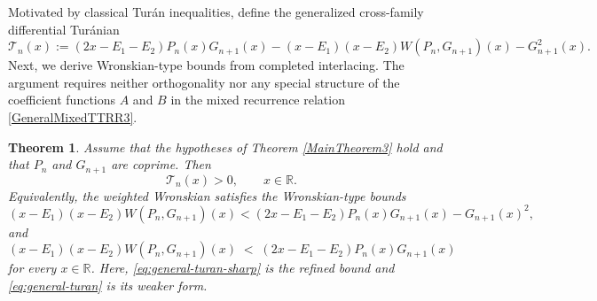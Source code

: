 \documentclass[final,3p,times,12pt]{elsarticle}
\newtheorem{theorem}{Theorem}[section]
\numberwithin{equation}{section}  %
\begin{document}
Motivated by classical Tur\'{a}n inequalities, define the
generalized cross-family differential Tur\'{a}nian
\[
\mathcal{T}_n(x):=
(2x-E_1-E_2)P_n(x)G_{n+1}(x)
-(x-E_1)(x-E_2)W(P_n,G_{n+1})(x)
-G_{n+1}^2(x).
\]
Next, we derive Wronskian-type bounds from completed interlacing. The argument requires neither orthogonality nor any special structure of the coefficient functions $A$ and $B$ in the mixed recurrence relation \eqref{GeneralMixedTTRR3}.

\begin{theorem}\label{thm:general}
	Assume that the hypotheses of Theorem \ref{MainTheorem3} hold and that $P_n$ and $
	G_{n+1}$ are coprime. Then \[\mathcal{T}_n(x)>0, \qquad x\in\mathbb{R}.\]
Equivalently, the weighted Wronskian satisfies the Wronskian-type bounds
	\begin{equation}
	\label{eq:general-turan-sharp}
	(x-E_1)(x-E_2)W(P_n,G_{n+1})(x)
	<
	(2x-E_1-E_2)P_n(x)G_{n+1}(x)-G_{n+1}(x)^2,
\end{equation}
	 and 
		\begin{equation}\label{eq:general-turan}
		(x-E_1)(x-E_2)W(P_n,G_{n+1})(x)
		\;<\;(2x-E_1-E_2)P_n(x)G_{n+1}(x) 
	\end{equation}
 for every $x\in\mathbb{R}$. Here, \eqref{eq:general-turan-sharp} is the refined bound and
\eqref{eq:general-turan} is its weaker form.
\end{theorem}
\end{document}

